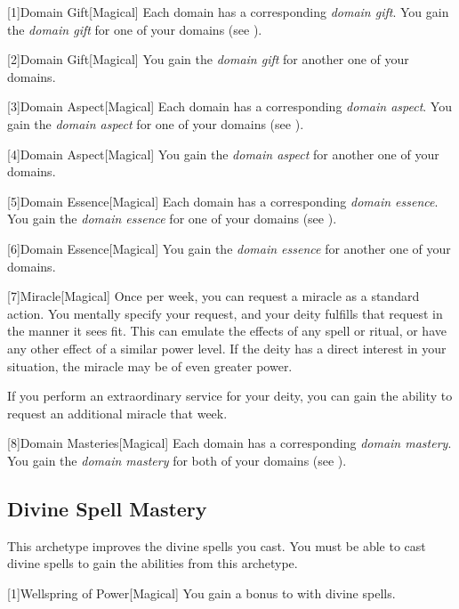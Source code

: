         [1]{Domain Gift}[Magical]
        Each domain has a corresponding \textit{domain gift}.
        You gain the \textit{domain gift} for one of your domains (see ).

        [2]{Domain Gift}[Magical]
        You gain the \textit{domain gift} for another one of your domains.

        [3]{Domain Aspect}[Magical]
        Each domain has a corresponding \textit{domain aspect}.
        You gain the \textit{domain aspect} for one of your domains (see ).

        [4]{Domain Aspect}[Magical]
        You gain the \textit{domain aspect} for another one of your domains.

        [5]{Domain Essence}[Magical]
        Each domain has a corresponding \textit{domain essence}.
        You gain the \textit{domain essence} for one of your domains (see ).

        [6]{Domain Essence}[Magical]
        You gain the \textit{domain essence} for another one of your domains.

        [7]{Miracle}[Magical]
        Once per week, you can request a miracle as a standard action.
        You mentally specify your request, and your deity fulfills that request in the manner it sees fit.
        This can emulate the effects of any spell or ritual, or have any other effect of a similar power level.
        If the deity has a direct interest in your situation, the miracle may be of even greater power.

        If you perform an extraordinary service for your deity, you can gain the ability to request an additional miracle that week.

        [8]{Domain Masteries}[Magical]
        Each domain has a corresponding \textit{domain mastery}.
        You gain the \textit{domain mastery} for both of your domains (see ).

    \subsection{Divine Spell Mastery}
        This archetype improves the divine spells you cast.
        You must be able to cast divine spells to gain the abilities from this archetype.

        [1]{Wellspring of Power}[Magical]
        You gain a  bonus to  with divine spells.

